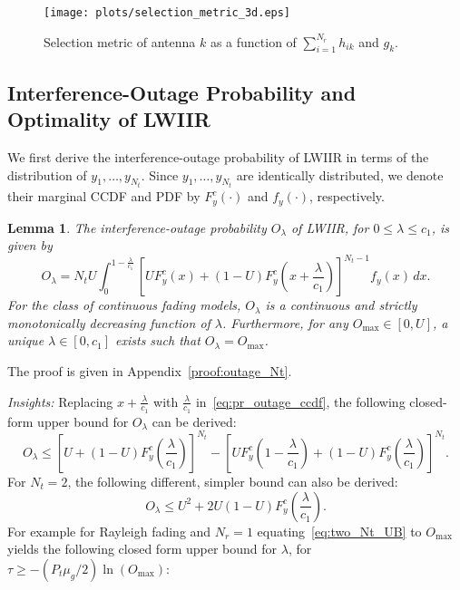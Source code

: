 \documentclass[12pt,draftcls,peerreview,onecolumn]{IEEEtran}
\newtheorem{lemma}{{\bf Lemma}}
\newcommand{\lam}{\lambda}
\newcommand{\mug}{{\mu_{g}}}
\newcommand{\Nt}{{N_t}}
\newcommand{\Nr}{{N_r}}
\newcommand{\Pt}{{P_t}}
\newcommand{\such}{h}
\newcommand{\puch}{g}
\newcommand{\hk}[1]{{\such_{#1}}}
\newcommand{\gk}[1]{{\puch_{#1}}}
\newcommand{\outmax}{O_{\text{max}}}
\newcommand{\itau}{\tau}
\newcommand{\cone}{c_{1}}
\newcommand{\out}{O}
\newcommand{\m}{\cone}
\newcommand{\lambym}{\frac{\lam}{\m}}
\newcommand{\yk}[1]{y_{#1}}
\newcommand{\un}{U}
\newcommand{\outlam}{\out_{\lam}}
\newcommand{\sumnr}{\sum_{i=1}^{\Nr}}
\begin{document}
\begin{figure}
\centering 
\texttt{[image: plots/selection\_metric\_3d.eps]}
\caption{Selection metric of antenna $k$ as a function of $\sumnr\hk{ik}$ and $\gk{k}$.}
\label{fig:metric}
\end{figure}

\subsection{Interference-Outage Probability and Optimality of LWIIR}
We first derive the interference-outage probability of LWIIR in terms of the distribution of $\yk{1},\ldots,\yk{\Nt}$. Since $\yk{1},\ldots,\yk{\Nt}$ are identically distributed, we denote their marginal CCDF and PDF by $F_{y}^{c}(\cdot)$ and $f_{y}(\cdot)$, respectively. 
\begin{lemma}
\label{lem:outage_Nt}
The interference-outage probability $\outlam$ of LWIIR, for $0\leq\lam\leq\cone$, is given by
\begin{equation}
\label{eq:pr_outage_ccdf} 
\outlam  =  \Nt\un \int_{0}^{1-\lambym} 	
\left[ \un F_{y}^{c}\left(x\right) + \left(1 -\un\right)F_{y}^{c}\left(x+\lambym\right) \right]^{\Nt-1} f_{y}(x)\,dx.
\end{equation}
For the class of continuous fading models, $\outlam$ is a continuous and strictly monotonically decreasing function of $\lam$. Furthermore, for any $\outmax\in[0,\un]$, a unique $\lam\in[0,\cone]$ exists such that $\outlam=\outmax$. 
\end{lemma}
%
\begin{IEEEproof}
    The proof is given in Appendix~\ref{proof:outage_Nt}.
\end{IEEEproof}
%

{\em Insights:} Replacing $x+\lambym$ with $\lambym$ in~\eqref{eq:pr_outage_ccdf}, the following closed-form upper bound for $\outlam$ can be derived: 
\begin{equation}
\label{eq:pr_outage_ub}
\outlam  \leq \left[ \un + \left(1-\un\right)F_{y}^{c}\left(\lambym\right)  \right]^{\Nt} - \left[ \un F_{y}^{c}\left(1-\lambym\right) + \left(1-\un\right)F_{y}^{c}\left(\lambym\right)  \right]^{\Nt}.
\end{equation}
For $\Nt = 2$, the following different, simpler bound can also be derived: 
\begin{equation}
\label{eq:two_Nt_UB}
\outlam \leq \un^2 + 2\un(1-\un)F_{y}^{c}\left(\lambym\right).
\end{equation}
For example for Rayleigh fading and $\Nr=1$ equating~\eqref{eq:two_Nt_UB} to $\outmax$ yields the following closed form upper bound for $\lam$, for $\itau\geq-\left( \Pt\mug/{2}\right) \ln\left({\outmax}\right)$:
\end{document}
